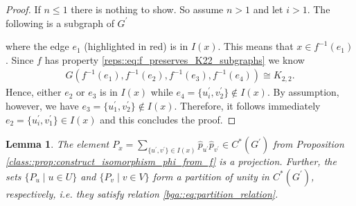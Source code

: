 \documentclass[a4paper]{amsart}
\newtheorem{lemma}[thm]{Lemma}
\begin{document}
\begin{proof}
    If $n \leq 1$ there is nothing to show. So assume $n > 1$ and let $i > 1$. The following is a subgraph of $G^\prime$
%
    \begin{center}
    \end{center}
%
    where the edge $e_1$ (highlighted in red) is in $I(x)$. This means that $x \in f^{-1}(e_1)$. Since $f$ has property \eqref{reps::eq:f_preserves_K22_subgraphs} we know
    \begin{align*}
        G\left(f^{-1}(e_1), f^{-1}(e_2), f^{-1}(e_3), f^{-1}(e_4)\right) \cong K_{2,2}.
    \end{align*}
    Hence, either $e_2$ or $e_3$ is in $I(x)$ while $e_4 = \{u_i^\prime, v_2^\prime\} \not \in I(x)$. By assumption, however, we have $e_3 = \{u_1^\prime, v_2^\prime\} \not \in I(x)$. Therefore, it follows immediately $e_2 = \{u_i^\prime, v_1^\prime\} \in I(x)$ and this concludes the proof.
\end{proof}

\begin{lemma} 
    \label{class::lemma:Px_is_a_projections}
    The element $P_x = \sum_{\{u^\prime, v^\prime\} \in I(x)} \hat{p}_{u^\prime} \hat{p}_{v^\prime} \in C^\ast(G^\prime)$ from Proposition \ref{class::prop:construct_isomorphism_phi_from_f} is a projection. Further, the sets $\{P_u \mid u \in U\}$ and $\{P_v \mid v \in V\}$ form a partition of unity in $C^\ast(G^\prime)$, respectively, i.e. they satisfy relation \eqref{bga::eq:partition_relation}.
\end{lemma}
\end{document}
